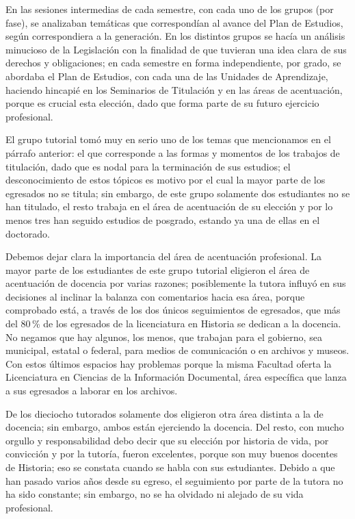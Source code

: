 \enlargethispage{1\baselineskip}
En las sesiones intermedias de cada semestre, con cada uno de los grupos
(por fase), se analizaban temáticas que correspondían al avance del Plan de
Estudios, según correspondiera a la generación. En los distintos grupos se
hacía un análisis minucioso de la Legislación con la finalidad de que
tuvieran una idea clara de sus derechos y obligaciones; en cada semestre en
forma independiente, por grado, se abordaba el Plan de Estudios, con cada
una de las Unidades de Aprendizaje, haciendo hincapié en los Seminarios de
Titulación y en las áreas de acentuación, porque es crucial esta elección,
dado que forma parte de su futuro ejercicio profesional.


El grupo tutorial tomó muy en serio uno de los temas que mencionamos en el
párrafo anterior: el que corresponde a las formas y momentos de los
trabajos de titulación, dado que es nodal para la terminación de sus
estudios; el desconocimiento de estos tópicos es motivo por el cual la
mayor parte de los egresados no se titula; sin embargo, de este grupo
solamente dos estudiantes no se han titulado, el resto trabaja en el área
de acentuación de su elección y por lo menos tres han seguido estudios de
posgrado, estando ya una de ellas en el doctorado.


Debemos dejar clara la importancia del área de acentuación profesional. La
mayor parte de los estudiantes de este grupo tutorial eligieron el área de
acentuación de docencia por varias razones; posiblemente la tutora influyó
en sus decisiones al inclinar la balanza con comentarios hacia esa área,
porque comprobado está, a través de los dos únicos seguimientos de egresados,
que más del 80\,\% de los egresados de la licenciatura en Historia se dedican
a la docencia. No negamos que hay algunos, los menos, que trabajan para el
gobierno, sea municipal, estatal o federal, para medios de comunicación o
en archivos y museos. Con estos últimos espacios hay problemas porque la
misma Facultad oferta la Licenciatura en Ciencias de la Información
Documental, área específica que lanza a sus egresados a laborar en los
archivos.


De los dieciocho tutorados solamente dos eligieron otra área distinta a la
de docencia; sin embargo, ambos están ejerciendo la docencia. Del resto, con
mucho orgullo y responsabilidad debo decir que su elección por historia de
vida, por convicción y por la tutoría, fueron excelentes, porque son muy
buenos docentes de Historia; eso se constata cuando se habla con sus
estudiantes. Debido a que han pasado varios años desde su egreso, el
seguimiento por parte de la tutora no ha sido constante; sin embargo, no se
ha olvidado ni alejado de su vida profesional.


